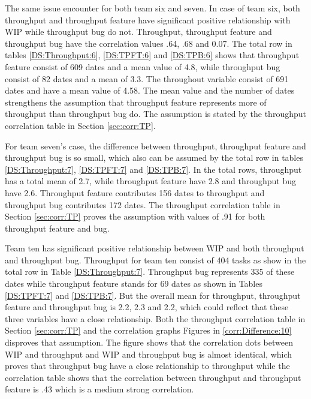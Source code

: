 \documentclass[UKenglish]{ifimaster}  %
\begin{document}
\newpage


The same issue encounter for both team six and seven. In case of team six, both throughput and throughput feature have significant positive relationship with WIP while throughput bug do not. Throughput, throughput feature and throughput bug have the correlation values .64, .68 and 0.07. The total row in tables \ref{DS:Throughput:6},  \ref{DS:TPFT:6} and \ref{DS:TPB:6} shows that throughput feature consist of 609 dates and a mean value of 4.8, while throughput bug consist of 82 dates  and a mean of 3.3. The throughout variable consist of 691 dates and have a mean value of 4.58. The mean value and the number of dates strengthens the assumption that throughput feature represents more of throughput than throughput bug do. The assumption is stated by the throughput correlation table in Section \ref{sec:corr:TP}.


For team seven's case, the difference between throughput, throughput feature and throughput bug is so small, which also can be assumed by the total row in tables \ref{DS:Throughput:7},  \ref{DS:TPFT:7} and \ref{DS:TPB:7}. In the total rows, throughput has a total mean of 2.7, while throughput feature have 2.8 and throughput bug have 2.6. Throughput feature contributes 156 dates to throughput and throughput bug contributes 172 dates. The throughput correlation table in Section \ref{sec:corr:TP} proves the assumption with values of .91 for both throughput feature and bug.  

Team ten has significant positive relationship between WIP and both throughput and throughput bug. Throughput for team ten consist of 404 tasks as show in the total row in Table \ref{DS:Throughput:7}. Throughput bug represents 335 of these dates while throughput feature stands for 69 dates as shown in Tables \ref{DS:TPFT:7} and \ref{DS:TPB:7}. But the overall mean for throughput, throughput feature and throughput bug is 2.2, 2.3 and 2.2, which could reflect that these three variables have a close relationship. Both the throughput correlation table in Section \ref{sec:corr:TP} and the correlation graphs Figures in \ref{corr:Difference:10} disproves that assumption. The figure shows that the correlation dots between WIP and throughput and WIP and throughput bug is almost identical, which proves that throughput bug have a close relationship to throughput while the correlation table shows that the correlation between throughput and throughput feature is .43 which is a medium strong correlation. 
\end{document}
